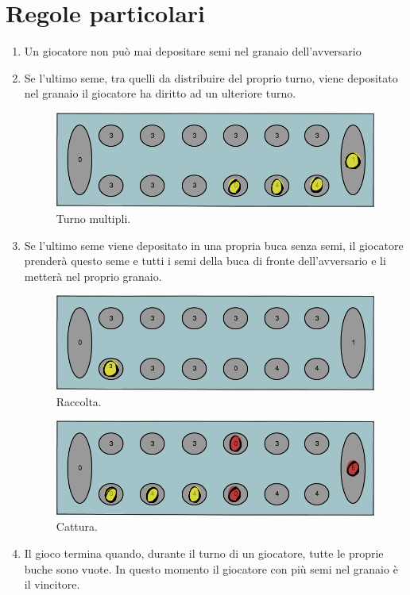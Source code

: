 \documentclass[paper=a4, fontsize=11pt]{scrartcl}	%
\numberwithin{equation}{section}															%
\numberwithin{figure}{section}																%
\numberwithin{table}{section}																%
\begin{document}
\section{Regole particolari}
\begin{enumerate}
	\item Un giocatore non pu\`o mai depositare semi nel granaio dell'avversario
	\item Se l'ultimo seme, tra quelli da distribuire del proprio turno, viene depositato nel granaio il giocatore ha diritto ad un ulteriore turno.

\begin{figure}[h]
\centering
        \includegraphics[totalheight=3cm]{Bantumi_4.png}
    \caption{Turno multipli.}
    \label{fig:verticalcell}
\end{figure}
	\item Se l'ultimo seme viene depositato in una propria buca senza semi, il giocatore prender\`a questo seme e tutti i semi della buca di fronte dell'avversario e li metter\`a nel proprio granaio.

\begin{figure}[h]
\centering
        \includegraphics[totalheight=3cm]{Bantumi_2.png}
    \caption{Raccolta.}
    \label{fig:verticalcell}
\end{figure}
\begin{figure}[h]
\centering
        \includegraphics[totalheight=3cm]{Bantumi2.png}
    \caption{Cattura.}
    \label{fig:verticalcell}
\end{figure}

	\item Il gioco termina quando, durante il turno di un giocatore,  tutte le proprie buche sono vuote. In questo momento il giocatore con pi\`u semi nel granaio \`e il vincitore.
\end{enumerate}
\end{document}
